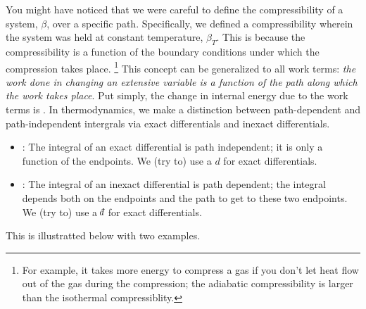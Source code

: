 \documentclass[12pt]{article}
\def\dbar{{\mathchar'26\mkern-12mu d}}
\begin{document}
You might have noticed that we were careful to define the compressibility of a system, $\beta$, over a specific path. Specifically, we defined a compressibility wherein the system was held at constant temperature, $\beta_T$. This is because the compressibility is a function of the boundary conditions under which the compression takes place. \footnote{For example, it takes more energy to compress a gas if you don't let heat flow out of the gas during the compression; the adiabatic compressibility is larger than the isothermal compressiblity.} This concept can be generalized to all work terms: \emph{the work done in changing an extensive variable is a function of the path along which the work takes place}. Put simply, the change in internal energy due to the work terms is . In thermodynamics, we make a distinction between path-dependent and path-independent intergrals via exact differentials and inexact differentials. 
\begin{itemize}
\item {}: The integral of an exact differential is path independent; it is only a function of the endpoints. We (try to) use a $d$ for exact differentials.
\item {}: The integral of an inexact differential is path dependent; the integral depends both on the endpoints and the path to get to these two endpoints. We (try to) use a $\dbar$ for exact differentials.
\end{itemize}
This is illustratted below with two examples.
\end{document}
